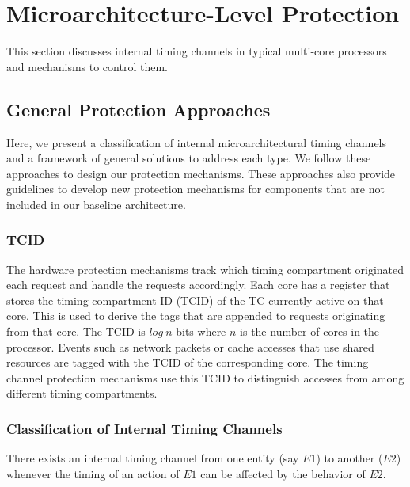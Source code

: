 \section{Microarchitecture-Level Protection}

This section discusses internal timing channels in typical
multi-core processors and mechanisms to control them.


\subsection{General Protection Approaches}
\label{sec:general_approaches}

Here, we present a classification of internal microarchitectural timing channels 
and a framework of general solutions to address each type.
We follow these approaches to design our
protection mechanisms. These approaches also provide guidelines to
develop new protection mechanisms for components that are not included in
our baseline architecture.

\subsubsection{TCID}

The hardware protection mechanisms track which timing compartment originated 
each request and handle the requests accordingly. Each core has a register that 
stores the timing compartment ID (TCID) of the TC currently active on that core. This is used to derive 
the tags that are appended to requests originating from that core. The TCID is 
$log\ n$ bits where $n$ is the number of cores in the processor.
Events such as network packets or cache accesses that use shared resources are 
tagged with the TCID of the corresponding core. 
The timing channel protection mechanisms use this TCID to distinguish accesses
from among different timing compartments.

\subsubsection{Classification of Internal Timing Channels}

There exists an internal timing channel from one entity (say $E1$)
to another ($E2$) whenever the timing of an action of $E1$ can be affected 
by the behavior of $E2$.

